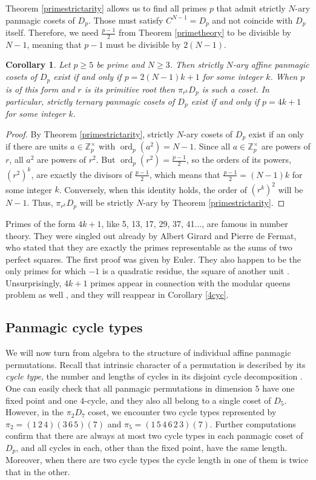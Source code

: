 \documentclass[11pt]{article}
\theoremstyle{plain}
\newtheorem{corollary}{Corollary}
\theoremstyle{definition}
\newcommand{\+}[1]{{#1}^\times}
\DeclareMathOperator{\ord}{ord}
\def\Z{{\mathbb Z}}
\begin{document}
\noindent Theorem \ref{primestrictarity} allows us to find all primes $p$ that admit strictly $N$-ary panmagic cosets of $D_p$. Those must satisfy $C^{N-1}=D_p$ and not coincide with $D_p$ itself. Therefore, we need $\frac{p-1}{2}$ from Theorem \ref{primetheory} to be divisible by $N-1$, meaning that $p-1$ must be divisible by $2(N-1)$. 
\begin{corollary}\label{primeallstrictarity}
Let $p\geq5$ be prime and $N\geq3$. Then strictly $N$-ary affine panmagic cosets of $D_p$ exist if and only if $p=2(N-1)k+1$ for some integer $k$. When $p$  is of this form and $r$ is its primitive root then $\pi_{r^k}D_p$ is such a coset. In particular, strictly ternary panmagic cosets of $D_p$ exist if and only if $p=4k+1$ for some integer $k$.
\end{corollary}
\begin{proof} By Theorem \ref{primestrictarity}, strictly $N$-ary cosets of $D_p$ exist if an only if there are units $a\in\Z_p^{\times}$ with $\ord_p(a^2)=N-1$. Since all $a\in\Z_p^{\times}$ are powers of $r$, all $a^2$ are powers of $r^2$. But $\ord_p(r^2)=\frac{p-1}{2}$, so the orders of its powers, $(r^2)^k$, are exactly the divisors of $\frac{p-1}{2}$, which means that $\frac{p-1}{2}=(N-1)k$ for some integer $k$. Conversely, when this identity holds, the order of $(r^{k})^2$ will be $N-1$. Thus, $\pi_{r^k}D_p$ will be strictly $N$-ary by Theorem \ref{primestrictarity}.
\end{proof}
\noindent Primes of the form $4k+1$, like 5, 13, 17, 29, 37, 41..., are famous in number theory. They were singled out already by Albert Girard and Pierre de Fermat, who stated that they are exactly the primes representable as the sums of two perfect squares. The first proof was given by Euler. They also happen to be the only primes for which $-1$ is a quadratic residue, the square of another unit \cite{Rosen}. Unsurprisingly, $4k+1$ primes appear in connection with the modular queens problem as well \cite{BS1}, and they will reappear in Corollary \ref{4cyc}. 

\subsection{Panmagic cycle types}

We will now turn from algebra to the structure of individual affine panmagic permutations. Recall that intrinsic character of a permutation is described by its {\it cycle type}, the number and lengths of cycles in its disjoint cycle decomposition \cite{Gallian}. One can easily check that all panmagic permutations in dimension $5$ have one fixed point and one $4$-cycle, and they also all belong to a single coset of $D_5$. However, in the $\pi_2D_7$ coset, we encounter two cycle types represented by $\pi_2=(1\,2\,4)(3\,6\,5)(7)$ and $\pi_5=(1\,5\,4\,6\,2\,3)(7)$. Further computations confirm that there are always at most two cycle types in each panmagic coset of $D_p$, and all cycles in each, other than the fixed point, have the same length. Moreover, when there are two cycle types the cycle length in one of them is twice that in the other.
\end{document}
